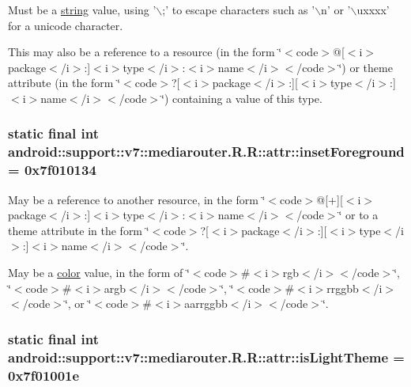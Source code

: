 Must be a \hyperlink{classandroid_1_1support_1_1v7_1_1mediarouter_1_1_r_1_1string}{string} value, using '$\backslash$;' to escape characters such as '$\backslash$n' or '$\backslash$uxxxx' for a unicode character. 

This may also be a reference to a resource (in the form \char`\"{}$<$code$>$@\mbox{[}$<$i$>$package$<$/i$>$:\mbox{]}$<$i$>$type$<$/i$>$:$<$i$>$name$<$/i$>$$<$/code$>$\char`\"{}) or theme attribute (in the form \char`\"{}$<$code$>$?\mbox{[}$<$i$>$package$<$/i$>$:\mbox{]}\mbox{[}$<$i$>$type$<$/i$>$:\mbox{]}$<$i$>$name$<$/i$>$$<$/code$>$\char`\"{}) containing a value of this type. \hypertarget{classandroid_1_1support_1_1v7_1_1mediarouter_1_1_r_1_1attr_d45aa97360f51745abdb317af060d98a}{
\subsubsection[{insetForeground}]{\setlength{\rightskip}{0pt plus 5cm}static final int android::support::v7::mediarouter.R.R::attr::insetForeground = 0x7f010134}}
\label{classandroid_1_1support_1_1v7_1_1mediarouter_1_1_r_1_1attr_d45aa97360f51745abdb317af060d98a}


May be a reference to another resource, in the form \char`\"{}$<$code$>$@\mbox{[}+\mbox{]}\mbox{[}$<$i$>$package$<$/i$>$:\mbox{]}$<$i$>$type$<$/i$>$:$<$i$>$name$<$/i$>$$<$/code$>$\char`\"{} or to a theme attribute in the form \char`\"{}$<$code$>$?\mbox{[}$<$i$>$package$<$/i$>$:\mbox{]}\mbox{[}$<$i$>$type$<$/i$>$:\mbox{]}$<$i$>$name$<$/i$>$$<$/code$>$\char`\"{}. 

May be a \hyperlink{classandroid_1_1support_1_1v7_1_1mediarouter_1_1_r_1_1color}{color} value, in the form of \char`\"{}$<$code$>$\#$<$i$>$rgb$<$/i$>$$<$/code$>$\char`\"{}, \char`\"{}$<$code$>$\#$<$i$>$argb$<$/i$>$$<$/code$>$\char`\"{}, \char`\"{}$<$code$>$\#$<$i$>$rrggbb$<$/i$>$$<$/code$>$\char`\"{}, or \char`\"{}$<$code$>$\#$<$i$>$aarrggbb$<$/i$>$$<$/code$>$\char`\"{}. \hypertarget{classandroid_1_1support_1_1v7_1_1mediarouter_1_1_r_1_1attr_9f45dec89825319bf09503440fe7af1b}{
\subsubsection[{isLightTheme}]{\setlength{\rightskip}{0pt plus 5cm}static final int android::support::v7::mediarouter.R.R::attr::isLightTheme = 0x7f01001e}}
\label{classandroid_1_1support_1_1v7_1_1mediarouter_1_1_r_1_1attr_9f45dec89825319bf09503440fe7af1b}


